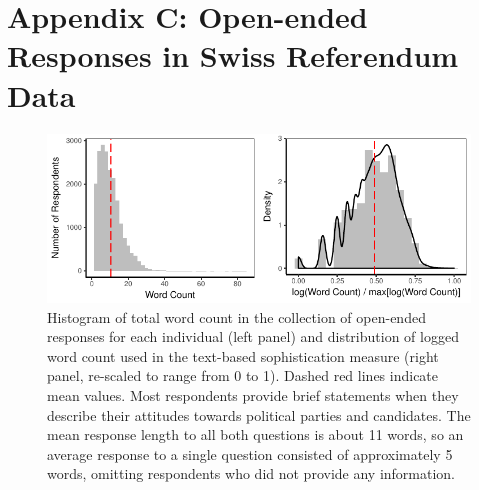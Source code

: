 \documentclass[12pt]{article}
\begin{document}
\clearpage
\section*{Appendix C: Open-ended Responses in Swiss Referendum Data}
\renewcommand\thefigure{B.\arabic{figure}}
\renewcommand\thetable{B.\arabic{table}}
\setcounter{figure}{0}
\setcounter{table}{0}

\begin{figure}[h]\centering
\includegraphics{../fig/swiss_wc.pdf}
\caption{Histogram of total word count in the collection of open-ended responses for each individual (left panel) and distribution of logged word count used in the text-based sophistication measure (right panel, re-scaled to range from 0 to 1). Dashed red lines indicate mean values. Most respondents provide brief statements when they describe their attitudes towards political parties and candidates. The mean response length to all both questions is about 11 words, so an average response to a single question consisted of approximately 5 words, omitting respondents who did not provide any information.}\label{fig:swiss_wc}
\end{figure}
\end{document}
